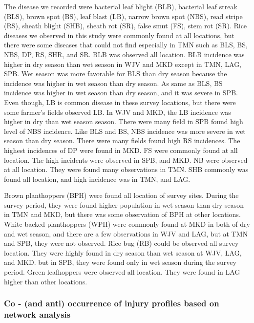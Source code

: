 The disease we recorded were bacterial leaf blight (BLB), bacterial leaf streak (BLS), brown spot (BS), leaf blast (LB), narrow brown spot (NBS), read stripe (RS), sheath blight (SHB), sheath rot (SR), false smut (FS), stem rot (SR). Rice diseases we observed in this study were commonly found at all locations, but there were some diseases that could not find especially in TMN such as BLS, BS, NBS, DP, RS, SHR, and SR. BLB was observed all location. BLB incidence was higher in dry season than wet season in WJV and MKD except in TMN, LAG, SPB. Wet season was more favorable for BLS than dry season because the incidence was higher in wet season than dry season. As same as BLS, BS incidence was higher in wet season than dry season, and it was severe in SPB. Even though, LB is common disease in these survey locations, but there were some farmer’s fields observed LB. In WJV and MKD, the LB incidence was higher in dry than wet season season. There were many field in SPB found high level of NBS incidence. Like BLS and BS, NBS incidence was more severe in wet season than dry season. There were many fields found high RS incidences. The highest incidences of DP were found in MKD. FS were commonly found at all location. The high incidents were observed in SPB, and MKD. NB were observed at all location. They were found many observations in TMN.  SHB commonly was found all location, and high incidence was in TMN, and LAG. 

Brown planthoppers (BPH) were found all location of survey sites. During the survey period, they were found higher population in wet season than dry season in TMN and MKD, but there was some observation of BPH at other locations. White backed planthoppers (WPH) were commonly found at MKD in both of dry and wet season, and there are a few observations in WJV and LAG, but at TMN and SPB, they were not observed. Rice bug (RB) could be observed all survey location. They were highly found in dry season than wet season at WJV, LAG, and MKD. but in SPB, they were found only in wet season during the survey period.  Green leafhoppers were observed all location. They were found in LAG higher than other locations.

\subsubsection*{Co - (and anti) occurrence of injury profiles based on network analysis}

